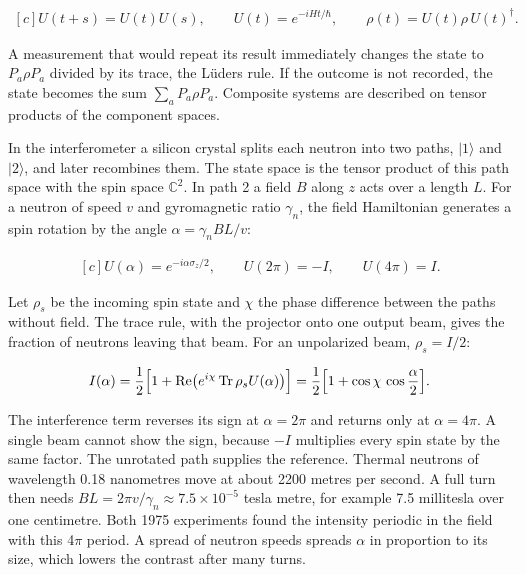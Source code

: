 \documentclass[11pt,oneside]{book}
\newenvironment{centeredalign}{\[\begin{gathered}[c]}{\end{gathered}\]}
\begin{document}
\begin{centeredalign}
U(t+s)=U(t)U(s),\qquad U(t)=e^{-iHt/\hbar},\qquad
\rho(t)=U(t)\rho\,U(t)^\dagger.
\end{centeredalign}

A measurement that would repeat its result immediately changes the state to \(P_a\rho P_a\) divided by its trace, the Lüders rule. If the outcome is not recorded, the state becomes the sum \(\sum_aP_a\rho P_a\). Composite systems are described on tensor products of the component spaces.

In the interferometer a silicon crystal splits each neutron into two paths, \(|1\rangle\) and \(|2\rangle\), and later recombines them. The state space is the tensor product of this path space with the spin space \(\mathbb C^2\). In path 2 a field \(B\) along \(z\) acts over a length \(L\). For a neutron of speed \(v\) and gyromagnetic ratio \(\gamma_n\), the field Hamiltonian generates a spin rotation by the angle \(\alpha=\gamma_nBL/v\):

\begin{centeredalign}
U(\alpha)=e^{-i\alpha\sigma_z/2},\qquad U(2\pi)=-I,\qquad U(4\pi)=I.
\end{centeredalign}

Let \(\rho_s\) be the incoming spin state and \(\chi\) the phase difference between the paths without field. The trace rule, with the projector onto one output beam, gives the fraction of neutrons leaving that beam. For an unpolarized beam, \(\rho_s=I/2\):

\begin{centeredalign}
I(\alpha)=\frac12\Bigl[1+\operatorname{Re}\bigl(e^{i\chi}\operatorname{Tr}\rho_sU(\alpha)\bigr)\Bigr]
=\frac12\Bigl[1+\cos\chi\,\cos\frac{\alpha}{2}\Bigr].
\end{centeredalign}

The interference term reverses its sign at \(\alpha=2\pi\) and returns only at \(\alpha=4\pi\). A single beam cannot show the sign, because \(-I\) multiplies every spin state by the same factor. The unrotated path supplies the reference. Thermal neutrons of wavelength 0.18 nanometres move at about 2200 metres per second. A full turn then needs \(BL=2\pi v/\gamma_n\approx7.5\times10^{-5}\) tesla metre, for example 7.5 millitesla over one centimetre. Both 1975 experiments found the intensity periodic in the field with this 4\(\pi\) period. A spread of neutron speeds spreads \(\alpha\) in proportion to its size, which lowers the contrast after many turns.
\end{document}
